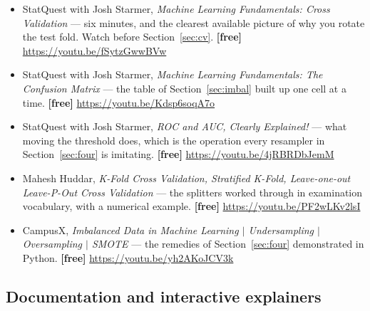 \documentclass[11pt]{article}
\begin{document}
\begin{itemize}[leftmargin=*]
  \item StatQuest with Josh Starmer, \emph{Machine Learning Fundamentals:
    Cross Validation} --- six minutes, and the clearest available picture of
    why you rotate the test fold. Watch before Section~\ref{sec:cv}.
    \textbf{[free]} \url{https://youtu.be/fSytzGwwBVw}
  \item StatQuest with Josh Starmer, \emph{Machine Learning Fundamentals: The
    Confusion Matrix} --- the table of Section~\ref{sec:imbal} built up one
    cell at a time. \textbf{[free]} \url{https://youtu.be/Kdsp6soqA7o}
  \item StatQuest with Josh Starmer, \emph{ROC and AUC, Clearly Explained!}
    --- what moving the threshold does, which is the operation every resampler
    in Section~\ref{sec:four} is imitating. \textbf{[free]}
    \url{https://youtu.be/4jRBRDbJemM}
  \item Mahesh Huddar, \emph{K-Fold Cross Validation, Stratified K-Fold,
    Leave-one-out Leave-P-Out Cross Validation} --- the splitters worked
    through in examination vocabulary, with a numerical example.
    \textbf{[free]} \url{https://youtu.be/PF2wLKv2lsI}
  \item CampusX, \emph{Imbalanced Data in Machine Learning $\vert$
    Undersampling $\vert$ Oversampling $\vert$ SMOTE} --- the remedies of
    Section~\ref{sec:four} demonstrated in Python. \textbf{[free]}
    \url{https://youtu.be/yh2AKoJCV3k}
\end{itemize}

\subsection*{Documentation and interactive explainers}
\end{document}
